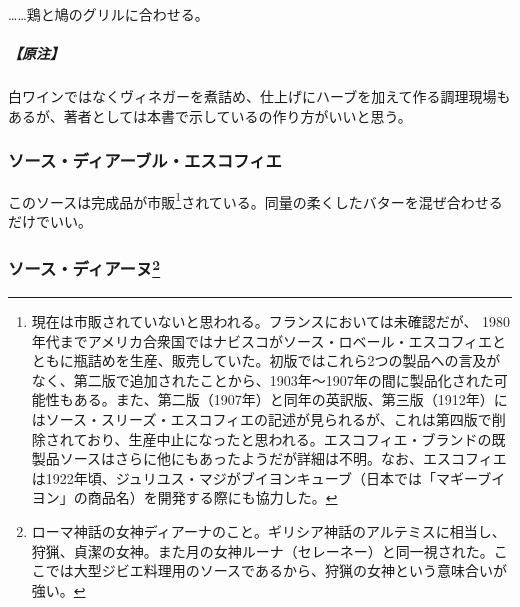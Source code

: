 \begin{recette}
\ldots{}\ldots{}鶏と鳩のグリルに合わせる。

\hypertarget{nota-sauce-diable}{%
\subparagraph{【原注】}\label{nota-sauce-diable}}

白ワインではなくヴィネガーを煮詰め、仕上げにハーブを加えて作る調理現場もあるが、著者としては本書で示しているの作り方がいいと思う。

\atoaki{}

\hypertarget{sauce-diable-escoffier}{%
\subsubsection{ソース・ディアーブル・エスコフィエ}\label{sauce-diable-escoffier}}



このソースは完成品が市販\footnote{現在は市販されていないと思われる。フランスにおいては未確認だが、
  1980年代までアメリカ合衆国ではナビスコがソース・ロベール・エスコフィエとともに瓶詰めを生産、販売していた。初版ではこれら2つの製品への言及がなく、第二版で追加されたことから、1903年〜1907年の間に製品化された可能性もある。また、第二版（1907年）と同年の英訳版、第三版（1912年）にはソース・スリーズ・エスコフィエの記述が見られるが、これは第四版で削除されており、生産中止になったと思われる。エスコフィエ・ブランドの既製品ソースはさらに他にもあったようだが詳細は不明。なお、エスコフィエは1922年頃、ジュリユス・マジがブイヨンキューブ（日本では「マギーブイヨン」の商品名）を開発する際にも協力した。}されている。同量の柔くしたバターを混ぜ合わせるだけでいい。

\atoaki{}

\hypertarget{sauce-diane}{%
\subsubsection[ソース・ディアーヌ]{\texorpdfstring{ソース・ディアーヌ\footnote{ローマ神話の女神ディアーナのこと。ギリシア神話のアルテミスに相当し、狩猟、貞潔の女神。また月の女神ルーナ（セレーネー）と同一視された。ここでは大型ジビエ料理用のソースであるから、狩猟の女神という意味合いが強い。}}{ソース・ディアーヌ}}\label{sauce-diane}}


\end{recette}
